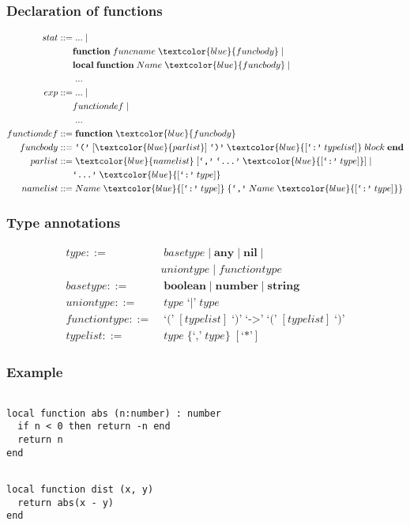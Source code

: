 \documentclass{beamer}
\begin{document}
\begin{frame}
\frametitle{Declaration of functions}
\begin{align*}
stat ::= & \; ... \; |\\
& \textbf{function} \; funcname \; \textcolor{blue}{funcbody} \; |\\
& \textbf{local} \; \textbf{function} \; Name \; \textcolor{blue}{funcbody} \; |\\
& \; ... \\
exp ::= & \; ... \; |\\
& functiondef \; |\\
& \; ...\\
functiondef ::= & \; \textbf{function} \; \textcolor{blue}{funcbody}\\
funcbody ::= & \; \texttt{`('} \; [\textcolor{blue}{parlist}] \; \texttt{`)'} \;
\textcolor{blue}{[\texttt{`:'} \; typelist]} \; block \; \textbf{end}\\
parlist ::= & \; \textcolor{blue}{namelist} \; [\texttt{`,'} \; \texttt{`...'} \;
\textcolor{blue}{[\texttt{`:'} \; type]}] \; | \;\\
& \texttt{`...'} \; \textcolor{blue}{[\texttt{`:'} \; type]}\\
namelist ::= & \; Name \; \textcolor{blue}{[\texttt{`:'} \; type]} \;
\{\texttt{`,'} \; Name \; \textcolor{blue}{[\texttt{`:'} \; type]}\}
\end{align*}
\end{frame}

\begin{frame}
\frametitle{Type annotations}
\begin{align*}
type ::= & \; basetype \;|\; \textbf{any} \;|\; \textbf{nil} \;|\\
& uniontype \;|\; functiontype\\
basetype ::= & \; \textbf{boolean} \;|\; \textbf{number} \;|\; \textbf{string}\\
uniontype ::= & \; type \;\texttt{`|'}\; type\\
functiontype ::= & \; \texttt{`('} \; [typelist] \; \texttt{`)'} \;
\texttt{`->'} \; \texttt{`('} \; [typelist] \; \texttt{`)'}\\
typelist ::= & \; type \; \{\texttt{`,'} \; type\} \; [\texttt{`*'}]
\end{align*}
\end{frame}

\begin{frame}
\frametitle{Example}
{\tt
\textcolor{white}{$Number \;\rightarrow\; Number$}\\
local function abs (n:number) : number\\
\textcolor{white}{--} if n < 0 then return -n end\\
\textcolor{white}{--} return n\\
end\\
\textcolor{white}{--}\\
\textcolor{white}{$Any \;\times\; Any \;\rightarrow\; Any$}\\
local function dist (x, y)\\
\textcolor{white}{--} return abs(x - y)\\
end\\
}
\end{frame}
\end{document}
